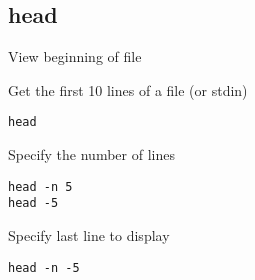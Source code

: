 \subsection{head}

\begin{frame}[fragile]{View beginning of file}
  \begin{exampleblock}{Get the first 10 lines of a file (or stdin)}
    \begin{lstlisting}[showstringspaces=false,basicstyle=\tiny]
head
    \end{lstlisting}
  \end{exampleblock}
\pause

  \begin{exampleblock}{Specify the number of lines}
    \begin{lstlisting}[showstringspaces=false,basicstyle=\tiny]
head -n 5
head -5
    \end{lstlisting}
  \end{exampleblock}
\pause

  \begin{exampleblock}{Specify last line to display}
    \begin{lstlisting}[showstringspaces=false,basicstyle=\tiny]
head -n -5
    \end{lstlisting}
  \end{exampleblock}
\end{frame}

